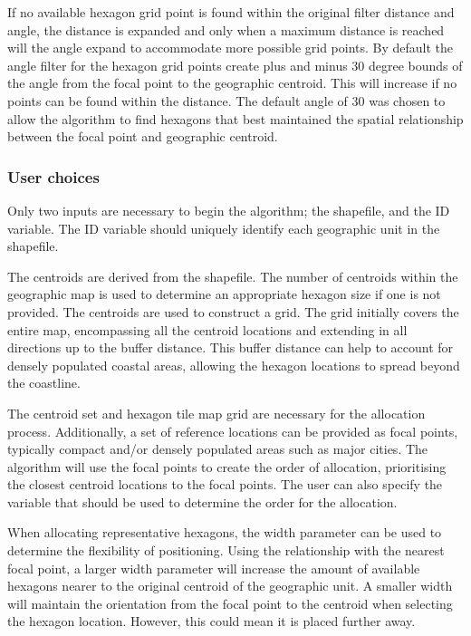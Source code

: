 If no available hexagon grid point is found within the original filter
distance and angle, the distance is expanded and only when a maximum
distance is reached will the angle expand to accommodate more possible
grid points. By default the angle filter for the hexagon grid points
create plus and minus 30 degree bounds of the angle from the focal point
to the geographic centroid. This will increase if no points can be found
within the  distance. The default angle of 30 was
chosen to allow the algorithm to find hexagons that best maintained the
spatial relationship between the focal point and geographic centroid.

\hypertarget{user-choices}{%
\subsubsection{User choices}\label{user-choices}}

Only two inputs are necessary to begin the algorithm; the shapefile, and
the ID variable. The ID variable should uniquely identify each
geographic unit in the shapefile.

The centroids are derived from the shapefile. The number of centroids
within the geographic map is used to determine an appropriate hexagon
size if one is not provided. The centroids are used to construct a grid.
The grid initially covers the entire map, encompassing all the centroid
locations and extending in all directions up to the buffer distance.
This buffer distance can help to account for densely populated coastal
areas, allowing the hexagon locations to spread beyond the coastline.

The centroid set and hexagon tile map grid are necessary for the
allocation process. Additionally, a set of reference locations can be
provided as focal points, typically compact and/or densely populated
areas such as major cities. The algorithm will use the focal points to
create the order of allocation, prioritising the closest centroid
locations to the focal points. The user can also specify the variable
that should be used to determine the order for the allocation.

When allocating representative hexagons, the width parameter can be used
to determine the flexibility of positioning. Using the relationship with
the nearest focal point, a larger width parameter will increase the
amount of available hexagons nearer to the original centroid of the
geographic unit. A smaller width will maintain the orientation from the
focal point to the centroid when selecting the hexagon location.
However, this could mean it is placed further away.


